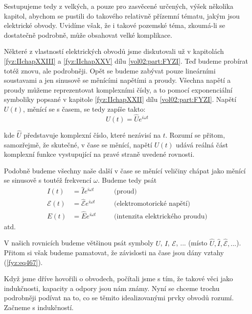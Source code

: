   Sestupujeme tedy z velkých, a pouze pro zasvěcené určených, výšek několika kapitol, abychom se 
  pustili do takového relativně přízemní tématu, jakým jsou elektrické obvody. Uvidíme však, že i 
  takové pozemské téma, zkoumá-li se dostatečně podrobně, může obsahovat velké komplikace.

  Některé z vlastností elektrických obvodů jsme diskutovali už v kapitolách \ref{fyz:IIchapXXIII} a 
  \ref{fyz:IIchapXXV} dílu \ref{vol02:part:FYZI}. Teď budeme probírat totéž znovu, ale podrobněji. Opět 
  se budeme zabývat pouze lineárními soustavami a jen sinusově se měnícími napětími a proudy. 
  Všechna napětí a proudy můžeme reprezentovat komplexními čísly, a to pomocí exponenciální 
  symboliky popsané v kapitole \ref{fyz:IIchapXXII} dílu \ref{vol02:part:FYZI}. Napětí \(U(t)\), 
  měnící se s časem, se tedy zapíše takto:
  \begin{equation}\label{fyz:eq466}
   U(t) = \hat{U}e^{i\omega t}
  \end{equation}
  
  kde \(\hat{U}\) představuje komplexní číslo, které nezávisí na \(t\). Rozumí se přitom, 
  samozřejmě, že skutečné, v čase se měnící, napětí \(U(t)\) udává reálná část komplexní funkce 
  vystupující na pravé straně uvedené rovnosti.
  
  Podobně budeme všechny naše další v čase se měnící veličiny chápat jako měnící se sinusově s 
  toutéž frekvencí \(\omega\). Budeme tedy psát
  \begin{subequations}\label{fyz:eq467}
  \begin{alignat}{3}
    I(t) &= \hat{I}e^{i\omega t} &&\quad\text{(proud)}                       \label{fyz:eq467a} \\
    \mathscr{E}(t) 
         &= \hat{\mathscr{E}}e^{i\omega t} 
                                 &&\quad\text{(elektromotorické napětí)}     \label{fyz:eq467b} \\ 
    E(t) &= \hat{E}e^{i\omega t} &&\quad\text{(intenzita elektrického proudu)} \label{fyz:eq467c}
  \end{alignat}
  \end{subequations}
  atd. 
  
  V našich rovnicích budeme většinou psát symboly \(U\), \(I\), \(\mathscr{E}\), ... (místo 
  \(\hat{U}, \hat{I}, \hat{\mathscr{E}}, ...\)). Přitom si však budeme pamatovat, že závislosti na 
  čase jsou dány vztahy (\ref{fyz:eq467}). 
  
  Když jsme dříve hovořili o obvodech, počítali jsme s tím, že takové věci jako indukčnosti, 
  kapacity a odpory jsou nám známy. Nyní se chceme trochu podrobněji podívat na to, co se těmito 
  idealizovanými prvky obvodů rozumí. Začneme s indukčností.


